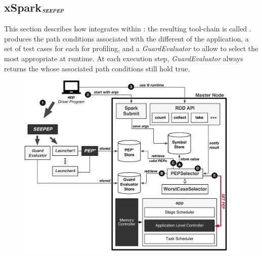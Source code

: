 

\subsection{xSpark$_{\text{\textit{\textbf{SEEPEP}}}}$}\label{sec:xspark_seepep}
This section describes how \dSymb integrates within \cSpark: the resulting tool-chain is called \tool. \dSymb produces the path conditions associated with the different \plans of the application, a set of test cases for each \plan for profiling, and a \textit{GuardEvaluator} to allow \cSpark to select the most appropriate \plan at runtime. At each execution step, \textit{GuardEvaluator} always returns the \plans whose associated path conditions still hold true. 

\begin{figure}[tbhp]
	\centering
	\includegraphics[width=\columnwidth]{images/xsparksymb}
	\caption{\tool}
	\label{fig:xsparkdagsymb}
\end{figure}

